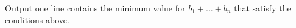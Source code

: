 Output one line contains the minimum value for $b_1 +\dots+ b_n$ that satisfy the conditions above.
